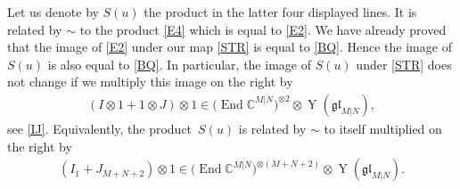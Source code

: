 \documentclass[10pt,a4paper]{amsart}
\numberwithin{equation}{section}
\def\CC{{\mathbb{C}}}
\def\CMN{\CC^{M|N}}
\def\End{\operatorname{End}}
\def\glMN{\mathfrak{gl}_{M|N}}
\def\ot{\otimes}
\def\YMN{\operatorname{Y}(\glMN)}
\begin{document}
Let us denote by $S(u)$ the product in the latter four displayed lines.
It is related by $\sim$ to the product \eqref{E4} which is equal to \eqref{E2}.
We have already proved that
the image of \eqref{E2} under our map \eqref{STR} is equal to \eqref{BQ}.
Hence the image of $S(u)$ is also equal to \eqref{BQ}.
In particular, the image of $S(u)$ under \eqref{STR}
does not change if we multiply this image on the right by
\begin{gather*}
( I\ot1+1\ot J )\ot1\in
\big(\End\CMN\big)^{\ot 2}\ot\YMN ,
\end{gather*}
see \eqref{IJ}. Equivalently, the product~$S(u)$
is related by $\sim$ to itself multiplied
on the right by
\begin{gather}\label{IJ1}
( I_{1}+J_{M+N+2} )\ot1\in
\big(\End\CMN\big)^{\ot (M+N+2)}\ot\YMN .
\end{gather}
\end{document}
